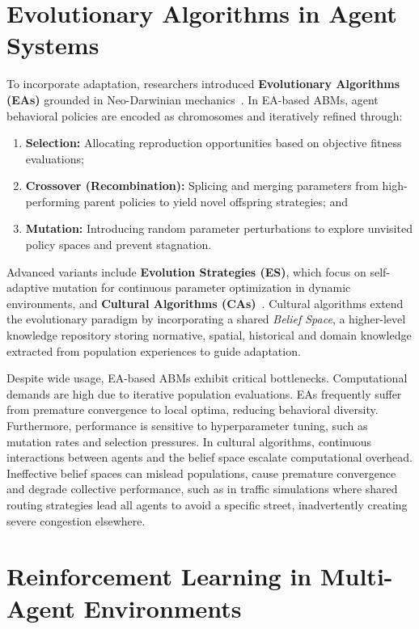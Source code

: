 \documentclass[12pt,a4paper]{report}
\begin{document}
\section{Evolutionary Algorithms in Agent Systems}
\label{sec:eas}

To incorporate adaptation, researchers introduced \textbf{Evolutionary Algorithms (EAs)} grounded in Neo-Darwinian mechanics~\cite{holland1992adaptation}. In EA-based ABMs, agent behavioral policies are encoded as chromosomes and iteratively refined through:
\begin{enumerate}[label=\arabic*.]
    \item \textbf{Selection:} Allocating reproduction opportunities based on objective fitness evaluations;
    \item \textbf{Crossover (Recombination):} Splicing and merging parameters from high-performing parent policies to yield novel offspring strategies; and
    \item \textbf{Mutation:} Introducing random parameter perturbations to explore unvisited policy spaces and prevent stagnation.
\end{enumerate}

Advanced variants include \textbf{Evolution Strategies (ES)}, which focus on self-adaptive mutation for continuous parameter optimization in dynamic environments, and \textbf{Cultural Algorithms (CAs)}~\cite{adornetto2025generative}. Cultural algorithms extend the evolutionary paradigm by incorporating a shared \textit{Belief Space}, a higher-level knowledge repository storing normative, spatial, historical and domain knowledge extracted from population experiences to guide adaptation.

Despite wide usage, EA-based ABMs exhibit critical bottlenecks. Computational demands are high due to iterative population evaluations. EAs frequently suffer from premature convergence to local optima, reducing behavioral diversity. Furthermore, performance is sensitive to hyperparameter tuning, such as mutation rates and selection pressures. In cultural algorithms, continuous interactions between agents and the belief space escalate computational overhead. Ineffective belief spaces can mislead populations, cause premature convergence and degrade collective performance, such as in traffic simulations where shared routing strategies lead all agents to avoid a specific street, inadvertently creating severe congestion elsewhere.

\section{Reinforcement Learning in Multi-Agent Environments}
\label{sec:rl}
\end{document}
